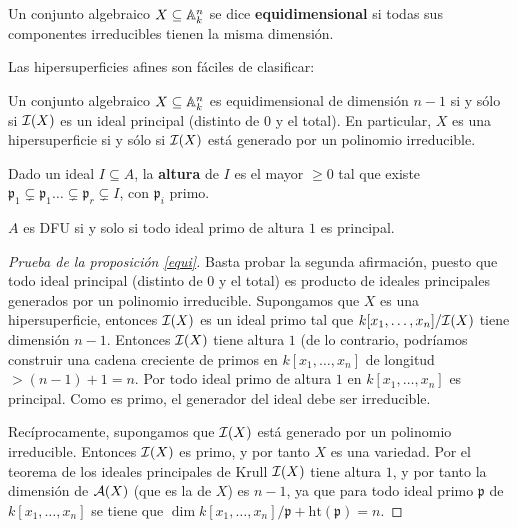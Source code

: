 \documentclass[ACGA.tex]{subfiles}
\begin{document}
\begin{defi}
 Un conjunto algebraico $X\subseteq \mathbb{A}^n_k$ se dice {\bf equidimensional} si todas sus componentes irreducibles tienen la misma dimensión.
\end{defi}


Las hipersuperficies afines son fáciles de clasificar:

\begin{prop}\label{equi}
 Un conjunto algebraico $X\subseteq\mathbb{A}^n_k$ es equidimensional de dimensión $n-1$ si y sólo si $\mathcal{I}(X)$ es un ideal principal (distinto de $0$ y el total). En particular, $X$ es una hipersuperficie si y sólo si $\mathcal{I}(X)$ está generado por un polinomio irreducible.
\end{prop}

\begin{defi}
Dado un ideal $I\subseteq A$, la {\bf altura } de $I$ es el mayor $\geq 0$ tal que existe $\mathfrak{p}_1\subsetneq\mathfrak{p}_1\dots\subsetneq\mathfrak{p}_r\subsetneq I$, con $\mathfrak{p}_i$ primo. 
\end{defi}

\begin{prop}
$A$ es DFU si y solo si todo ideal primo de altura $1$ es principal. 
\end{prop}

\begin{proof}[Prueba de la proposición \ref{equi}]
 Basta probar la segunda afirmación, puesto que todo ideal principal (distinto de $0$ y el total) es producto de ideales principales generados por un polinomio irreducible. Supongamos que $X$ es una hipersuperficie, entonces $\mathcal{I}(X)$ es un ideal primo tal que $k[x_1,\ldots,x_n]/\mathcal{I}(X)$ tiene dimensión $n-1$. Entonces $\mathcal{I}(X)$ tiene altura $1$ (de lo contrario, podríamos construir una cadena creciente de primos en $k[x_1,\ldots,x_n]$ de longitud $>(n-1)+1=n$. Por \cite[Proposition 1.12A]{h} todo ideal primo de altura $1$ en $k[x_1,\ldots,x_n]$ es principal. Como es primo, el generador del ideal debe ser irreducible.

Recíprocamente, supongamos que $\mathcal{I}(X)$ está generado por un polinomio irreducible. Entonces $\mathcal{I}(X)$ es primo, y por tanto $X$ es una variedad. Por el teorema de los ideales principales de Krull \cite[Corolario 11.17]{am} $\mathcal{I}(X)$ tiene altura $1$, y por tanto la dimensión de ${\mathcal A}(X)$ (que es la de $X$) es $n-1$, ya que para todo ideal primo $\mathfrak p$ de $k[x_1,\ldots,x_n]$ se tiene que $\dim k[x_1,\ldots,x_n]/{\mathfrak p}+\mathrm{ht}({\mathfrak p})=n$.
\end{proof}
\end{document}
